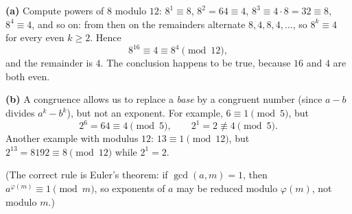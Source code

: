 \textbf{(a)} Compute powers of $8$ modulo $12$: $8^1\equiv8$, $8^2=64\equiv4$, $8^3\equiv4\cdot8=32\equiv8$, $8^4\equiv4$, and so on: from then on the remainders alternate $8,4,8,4,\dots$, so $8^k\equiv4$ for every even $k\ge2$. Hence
\[8^{16}\equiv4\equiv8^4\pmod{12},\]
and the remainder is $\boxed{4}$. The conclusion happens to be true, because $16$ and $4$ are both even.

\textbf{(b)} A congruence allows us to replace a \emph{base} by a congruent number (since $a-b$ divides $a^k-b^k$), but not an exponent. For example, $6\equiv1\pmod5$, but
\[2^6=64\equiv4\pmod5,\qquad 2^1=2\not\equiv4\pmod5.\]
Another example with modulus $12$: $13\equiv1\pmod{12}$, but $2^{13}=8192\equiv8\pmod{12}$ while $2^1=2$.

(The correct rule is Euler's theorem: if $\gcd(a,m)=1$, then $a^{\varphi(m)}\equiv1\pmod m$, so exponents of $a$ may be reduced modulo $\varphi(m)$, not modulo $m$.)
